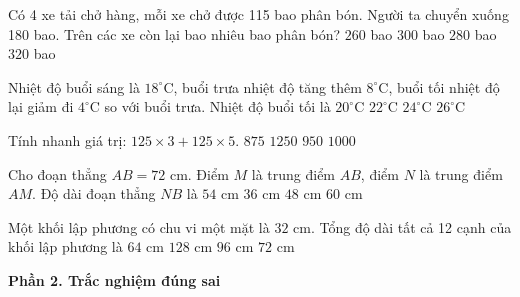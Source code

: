 \begin{ex} %
Có 4 xe tải chở hàng, mỗi xe chở được 115 bao phân bón. Người ta chuyển xuống 180 bao. Trên các xe còn lại bao nhiêu bao phân bón?
\choice
{$260$ bao}
{$300$ bao}
{\True $280$ bao}
{$320$ bao}
\end{ex}

\begin{ex} %
Nhiệt độ buổi sáng là $18^\circ\text{C}$, buổi trưa nhiệt độ tăng thêm $8^\circ\text{C}$, buổi tối nhiệt độ lại giảm đi $4^\circ\text{C}$ so với buổi trưa. Nhiệt độ buổi tối là
\choice
{$20^\circ\text{C}$}
{\True $22^\circ\text{C}$}
{$24^\circ\text{C}$}
{$26^\circ\text{C}$}
\end{ex}

\begin{ex} %
Tính nhanh giá trị: $125 \times 3 + 125 \times 5$.
\choice
{$875$}
{$1250$}
{$950$}
{\True $1000$}
\end{ex}

\begin{ex} %
Cho đoạn thẳng $AB = 72\text{ cm}$. Điểm $M$ là trung điểm $AB$, điểm $N$ là trung điểm $AM$. Độ dài đoạn thẳng $NB$ là
\choice
{\True $54\text{ cm}$}
{$36\text{ cm}$}
{$48\text{ cm}$}
{$60\text{ cm}$}
\end{ex}

\begin{ex} %
Một khối lập phương có chu vi một mặt là $32\text{ cm}$. Tổng độ dài tất cả 12 cạnh của khối lập phương là
\choice
{$64\text{ cm}$}
{$128\text{ cm}$}
{\True $96\text{ cm}$}
{$72\text{ cm}$}
\end{ex}

\textbf{Phần 2. Trắc nghiệm đúng sai}


